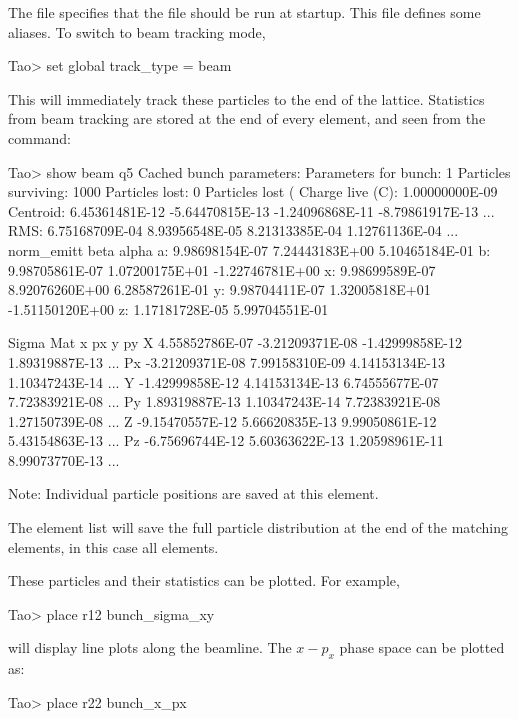 \documentclass{hitec}     %
\begin{document}
{The  file specifies that the  file should be run at startup. This
file defines some aliases. 
To switch to beam tracking mode, 
\begin{code}
Tao> set global track_type = beam
\end{code}
This will immediately track these particles to the end of the lattice. Statistics from beam tracking are stored at the end of every element, and seen from the  command:
\begin{code}
Tao> show beam q5
Cached bunch parameters:
  Parameters for bunch:       1
  Particles surviving:        1000
  Particles lost:             0
  Particles lost (%
  Charge live (C):              1.00000000E-09
  Centroid:  6.45361481E-12 -5.64470815E-13 -1.24096868E-11 -8.79861917E-13 ...
  RMS:       6.75168709E-04  8.93956548E-05  8.21313385E-04  1.12761136E-04 ...
             norm_emitt           beta             alpha
  a:         9.98698154E-07  7.24443183E+00  5.10465184E-01
  b:         9.98705861E-07  1.07200175E+01 -1.22746781E+00
  x:         9.98699589E-07  8.92076260E+00  6.28587261E-01
  y:         9.98704411E-07  1.32005818E+01 -1.51150120E+00
  z:         1.17181728E-05  5.99704551E-01

Sigma Mat       x              px               y              py      
X     4.55852786E-07 -3.21209371E-08 -1.42999858E-12  1.89319887E-13 ...
Px   -3.21209371E-08  7.99158310E-09  4.14153134E-13  1.10347243E-14 ...
Y    -1.42999858E-12  4.14153134E-13  6.74555677E-07  7.72383921E-08 ...
Py    1.89319887E-13  1.10347243E-14  7.72383921E-08  1.27150739E-08 ...
Z    -9.15470557E-12  5.66620835E-13  9.99050861E-12  5.43154863E-13 ...
Pz   -6.75696744E-12  5.60363622E-13  1.20598961E-11  8.99073770E-13 ...

Note: Individual particle positions are saved at this element.
\end{code}
The  element list will save the full particle distribution at the end of the matching elements, in this case all elements.  

These particles and their statistics can be plotted. For example,
\begin{code}
Tao> place r12 bunch_sigma_xy
\end{code}
will display line plots along the beamline.
The $x-p_x$ phase space can be plotted as:
\begin{code}
Tao> place r22 bunch_x_px
\end{code}

}
\end{document}
